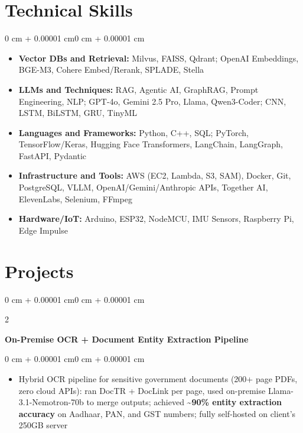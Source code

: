 \documentclass[10pt, letterpaper]{article}
\newenvironment{highlights}{
    \begin{itemize}[
        topsep=0.01 cm,
        parsep=0.01 cm,
        partopsep=0pt,
        itemsep=0pt,
        leftmargin=0 cm + 10pt
    ]
}{
    \end{itemize}
}
\newenvironment{highlightsforbulletentries}{
    \begin{itemize}[
        topsep=0.01 cm,
        parsep=0.01 cm,
        partopsep=0pt,
        itemsep=0pt,
        leftmargin=10pt
    ]
}{
    \end{itemize}
}
\newenvironment{onecolentry}{
    \begin{adjustwidth}{0 cm + 0.00001 cm}{0 cm + 0.00001 cm}
}{
    \end{adjustwidth}
}
\newenvironment{twocolentry}[2][]{
    \onecolentry
    \def\secondColumn{#2}
    \setcolumnwidth{\fill, 5.5 cm}
    \begin{paracol}{2}
}{
    \switchcolumn \raggedleft \secondColumn
    \end{paracol}
    \endonecolentry
}
\begin{document}
    \section{Technical Skills}

    \begin{onecolentry}
        \begin{highlightsforbulletentries}
            \item \textbf{Vector DBs and Retrieval:} Milvus, FAISS, Qdrant; OpenAI Embeddings, BGE-M3, Cohere Embed/Rerank, SPLADE, Stella
            \item \textbf{LLMs and Techniques:} RAG, Agentic AI, GraphRAG, Prompt Engineering, NLP; GPT-4o, Gemini 2.5 Pro, Llama, Qwen3-Coder; CNN, LSTM, BiLSTM, GRU, TinyML
            \item \textbf{Languages and Frameworks:} Python, C++, SQL; PyTorch, TensorFlow/Keras, Hugging Face Transformers, LangChain, LangGraph, FastAPI, Pydantic
            \item \textbf{Infrastructure and Tools:} AWS (EC2, Lambda, S3, SAM), Docker, Git, PostgreSQL, VLLM, OpenAI/Gemini/Anthropic APIs, Together AI, ElevenLabs, Selenium, FFmpeg
            \item \textbf{Hardware/IoT:} Arduino, ESP32, NodeMCU, IMU Sensors, Raspberry Pi, Edge Impulse
        \end{highlightsforbulletentries}
    \end{onecolentry}

    \section{Projects}

        \begin{twocolentry}{
            2024
        }
            \textbf{On-Premise OCR + Document Entity Extraction Pipeline}
        \end{twocolentry}

        \vspace{0.02 cm}
        \begin{onecolentry}
            \begin{highlights}
                \item Hybrid OCR pipeline for sensitive government documents (200+ page PDFs, zero cloud APIs): ran DocTR + DocLink per page, used on-premise Llama-3.1-Nemotron-70b to merge outputs; achieved \textasciitilde\textbf{90\% entity extraction accuracy} on Aadhaar, PAN, and GST numbers; fully self-hosted on client's 250GB server
            \end{highlights}
        \end{onecolentry}
\end{document}
